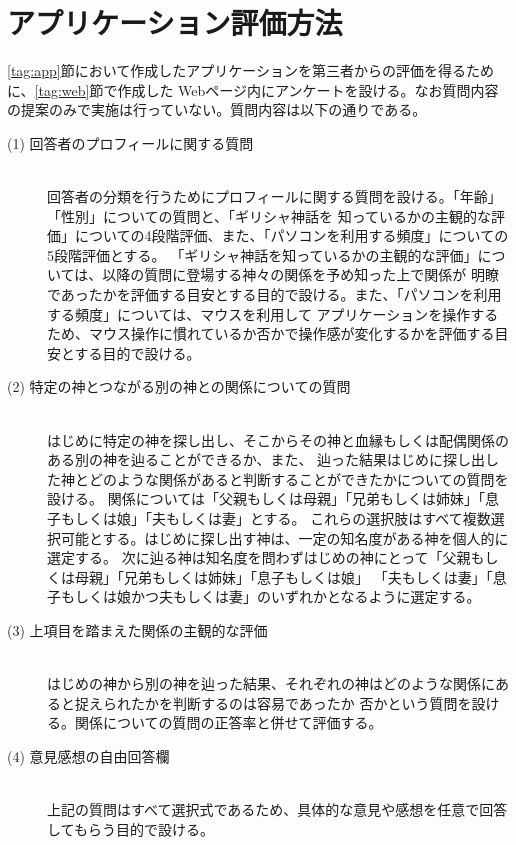\section{アプリケーション評価方法}
\label{tag:eval}

    \ref{tag:app}節において作成したアプリケーションを第三者からの評価を得るために、\ref{tag:web}節で作成した
    Webページ内にアンケートを設ける。なお質問内容の提案のみで実施は行っていない。質問内容は以下の通りである。

\begin{description}
  \item[(1) 回答者のプロフィールに関する質問]\mbox{}\\
      回答者の分類を行うためにプロフィールに関する質問を設ける。「年齢」「性別」についての質問と、「ギリシャ神話を
      知っているかの主観的な評価」についての4段階評価、また、「パソコンを利用する頻度」についての5段階評価とする。
      「ギリシャ神話を知っているかの主観的な評価」については、以降の質問に登場する神々の関係を予め知った上で関係が
      明瞭であったかを評価する目安とする目的で設ける。また、「パソコンを利用する頻度」については、マウスを利用して
      アプリケーションを操作するため、マウス操作に慣れているか否かで操作感が変化するかを評価する目安とする目的で設ける。

  \item[(2) 特定の神とつながる別の神との関係についての質問]\mbox{}\\
      はじめに特定の神を探し出し、そこからその神と血縁もしくは配偶関係のある別の神を辿ることができるか、また、
      辿った結果はじめに探し出した神とどのような関係があると判断することができたかについての質問を設ける。
      関係については「父親もしくは母親」「兄弟もしくは姉妹」「息子もしくは娘」「夫もしくは妻」とする。
      これらの選択肢はすべて複数選択可能とする。はじめに探し出す神は、一定の知名度がある神を個人的に選定する。
      次に辿る神は知名度を問わずはじめの神にとって「父親もしくは母親」「兄弟もしくは姉妹」「息子もしくは娘」
      「夫もしくは妻」「息子もしくは娘かつ夫もしくは妻」のいずれかとなるように選定する。

  \item[(3) 上項目を踏まえた関係の主観的な評価]\mbox{}\\
     はじめの神から別の神を辿った結果、それぞれの神はどのような関係にあると捉えられたかを判断するのは容易であったか
     否かという質問を設ける。関係についての質問の正答率と併せて評価する。

  \item[(4) 意見感想の自由回答欄]\mbox{}\\
     上記の質問はすべて選択式であるため、具体的な意見や感想を任意で回答してもらう目的で設ける。

\end{description}
